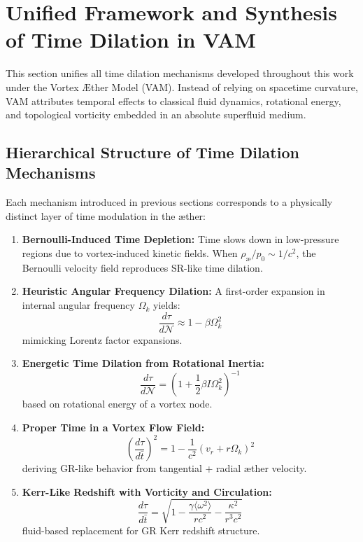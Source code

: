 \section{Unified Framework and Synthesis of Time Dilation in VAM}

This section unifies all time dilation mechanisms developed throughout this work under the Vortex Æther Model (VAM). Instead of relying on spacetime curvature, VAM attributes temporal effects to classical fluid dynamics, rotational energy, and topological vorticity embedded in an absolute superfluid medium.

\subsection{Hierarchical Structure of Time Dilation Mechanisms}

Each mechanism introduced in previous sections corresponds to a physically distinct layer of time modulation in the æther:

\begin{enumerate}
    \item \textbf{Bernoulli-Induced Time Depletion:} Time slows down in low-pressure regions due to vortex-induced kinetic fields. When \( \rho_\text{\ae} / p_0 \sim 1/c^2 \), the Bernoulli velocity field reproduces SR-like time dilation.

    \item \textbf{Heuristic Angular Frequency Dilation:} A first-order expansion in internal angular frequency \( \Omega_k \) yields:
    \[
        \frac{d\tau}{d\mathcal{N}} \approx 1 - \beta \Omega_k^2
    \]
    mimicking Lorentz factor expansions.

    \item \textbf{Energetic Time Dilation from Rotational Inertia:}
    \[
        \boxed{\frac{d\tau}{d\mathcal{N}} = \left(1 + \frac{1}{2} \beta I \Omega_k^2 \right)^{-1}}
    \]
    based on rotational energy of a vortex node.

    \item \textbf{Proper Time in a Vortex Flow Field:}
    \[
        \boxed{
        \left( \frac{d\tau}{d\bar{t}} \right)^2 = 1 - \frac{1}{c^2}(v_r + r \Omega_k)^2
        }
    \]
    deriving GR-like behavior from tangential + radial æther velocity.

    \item \textbf{Kerr-Like Redshift with Vorticity and Circulation:}
    \[
        \boxed{
        \frac{d\tau}{d\bar{t}} = \sqrt{1 - \frac{\gamma \langle \omega^2 \rangle}{r c^2} - \frac{\kappa^2}{r^3 c^2}}
        }
    \]
    fluid-based replacement for GR Kerr redshift structure.
\end{enumerate}


